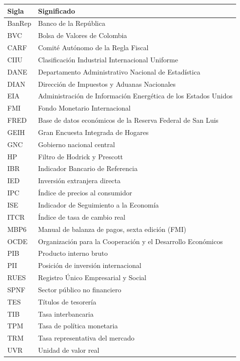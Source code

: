 \begin{center}
\small
\begin{tabularx}{\linewidth}{lX}
\toprule
\textbf{Sigla} & \textbf{Significado}\\
\midrule
BanRep & Banco de la República\\
BVC & Bolsa de Valores de Colombia\\
CARF & Comité Autónomo de la Regla Fiscal\\
CIIU & Clasificación Industrial Internacional Uniforme\\
DANE & Departamento Administrativo Nacional de Estadística\\
DIAN & Dirección de Impuestos y Aduanas Nacionales\\
EIA & Administración de Información Energética de los Estados Unidos\\
FMI & Fondo Monetario Internacional\\
FRED & Base de datos económicos de la Reserva Federal de San Luis\\
GEIH & Gran Encuesta Integrada de Hogares\\
GNC & Gobierno nacional central\\
HP & Filtro de Hodrick y Prescott\\
IBR & Indicador Bancario de Referencia\\
IED & Inversión extranjera directa\\
IPC & Índice de precios al consumidor\\
ISE & Indicador de Seguimiento a la Economía\\
ITCR & Índice de tasa de cambio real\\
MBP6 & Manual de balanza de pagos, sexta edición (FMI)\\
OCDE & Organización para la Cooperación y el Desarrollo Económicos\\
PIB & Producto interno bruto\\
PII & Posición de inversión internacional\\
RUES & Registro Único Empresarial y Social\\
SPNF & Sector público no financiero\\
TES & Títulos de tesorería\\
TIB & Tasa interbancaria\\
TPM & Tasa de política monetaria\\
TRM & Tasa representativa del mercado\\
UVR & Unidad de valor real\\
\bottomrule
\end{tabularx}
\end{center}

